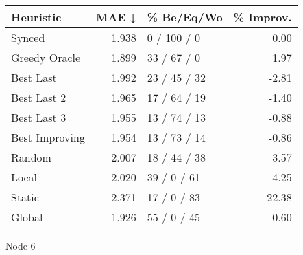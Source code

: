 \begin{tabular}{lrlr}
\toprule
\textbf{Heuristic} & \textbf{MAE ↓} & \textbf{\% Be/Eq/Wo} & \textbf{\% Improv.} \\
\midrule
            Synced &          1.938 &          0 / 100 / 0 &                0.00 \\
     Greedy Oracle &          1.899 &          33 / 67 / 0 &                1.97 \\
         Best Last &          1.992 &         23 / 45 / 32 &               -2.81 \\
       Best Last 2 &          1.965 &         17 / 64 / 19 &               -1.40 \\
       Best Last 3 &          1.955 &         13 / 74 / 13 &               -0.88 \\
    Best Improving &          1.954 &         13 / 73 / 14 &               -0.86 \\
            Random &          2.007 &         18 / 44 / 38 &               -3.57 \\
             Local &          2.020 &          39 / 0 / 61 &               -4.25 \\
            Static &          2.371 &          17 / 0 / 83 &              -22.38 \\
            Global &          1.926 &          55 / 0 / 45 &                0.60 \\
\bottomrule
\end{tabular}
\caption{Node 6}
\label{tab:hr_non_lr05_le1_bs4_6}
